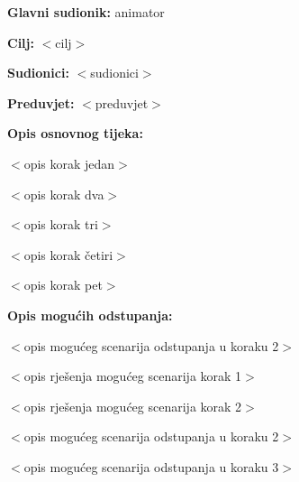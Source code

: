 					\noindent {}
					\begin{packed_item}
					
						\item \textbf{Glavni sudionik: }animator
						\item  \textbf{Cilj:} $<$cilj$>$
						\item  \textbf{Sudionici:} $<$sudionici$>$
						\item  \textbf{Preduvjet:} $<$preduvjet$>$
						\item  \textbf{Opis osnovnog tijeka:}
					
						\item[] \begin{packed_enum}
							
							\item $<$opis korak jedan$>$
							\item $<$opis korak dva$>$
							\item $<$opis korak tri$>$
							\item $<$opis korak četiri$>$
							\item $<$opis korak pet$>$
					\end{packed_enum}
					
					\item  \textbf{Opis mogućih odstupanja:}
					
					\item[] \begin{packed_item}
						
						\item[2.a] $<$opis mogućeg scenarija odstupanja u koraku 2$>$
						\item[] \begin{packed_enum}
							
							\item $<$opis rješenja mogućeg scenarija korak 1$>$
							\item $<$opis rješenja mogućeg scenarija korak 2$>$
							
						\end{packed_enum}
						\item[2.b] $<$opis mogućeg scenarija odstupanja u koraku 2$>$
						\item[3.a] $<$opis mogućeg scenarija odstupanja  u koraku 3$>$
						
						\end{packed_item}
					\end{packed_item}
			
